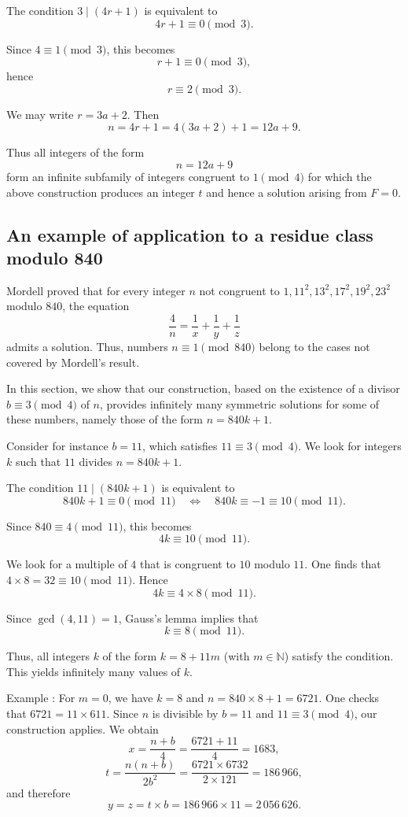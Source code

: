 \documentclass[12pt]{article}
\begin{document}
The condition $3 \mid (4r+1)$ is equivalent to
\[
4r+1 \equiv 0 \pmod{3}.
\]

Since $4 \equiv 1 \pmod{3}$, this becomes
\[
r+1 \equiv 0 \pmod{3},
\]
hence
\[
r \equiv 2 \pmod{3}.
\]

We may write $r = 3a+2$. Then
\[
n = 4r+1 = 4(3a+2)+1 = 12a+9.
\]

Thus all integers of the form
\[
n = 12a+9
\]
form an infinite subfamily of integers congruent to $1 \pmod{4}$
for which the above construction produces an integer $t$ and hence a solution arising from $F=0$.

\subsection*{An example of application to a residue class modulo 840}

Mordell proved that for every integer $n$ not congruent to $1, 11^2, 13^2, 17^2, 19^2, 23^2$ modulo $840$, the equation
\[
\frac{4}{n} = \frac{1}{x} + \frac{1}{y} + \frac{1}{z}
\]
admits a solution. Thus, numbers $n \equiv 1 \pmod{840}$ belong to the cases not covered by Mordell's result.

In this section, we show that our construction, based on the existence of a divisor $b \equiv 3 \pmod{4}$ of $n$, provides infinitely many symmetric solutions for some of these numbers, namely those of the form $n = 840k + 1$.

Consider for instance $b = 11$, which satisfies $11 \equiv 3 \pmod{4}$. We look for integers $k$ such that $11$ divides $n = 840k + 1$.

The condition $11 \mid (840k + 1)$ is equivalent to
\[
840k + 1 \equiv 0 \pmod{11} \quad \Longleftrightarrow \quad 840k \equiv -1 \equiv 10 \pmod{11}.
\]

Since $840 \equiv 4 \pmod{11}$, this becomes
\[
4k \equiv 10 \pmod{11}.
\]

We look for a multiple of $4$ that is congruent to $10$ modulo $11$. One finds that $4 \times 8 = 32 \equiv 10 \pmod{11}$. Hence
\[
4k \equiv 4 \times 8 \pmod{11}.
\]

Since $\gcd(4,11)=1$, Gauss's lemma implies that
\[
k \equiv 8 \pmod{11}.
\]

Thus, all integers $k$ of the form $k = 8 + 11m$ (with $m \in \mathbb{N}$) satisfy the condition. This yields infinitely many values of $k$.


Example : For $m = 0$, we have $k = 8$ and $n = 840 \times 8 + 1 = 6721$. One checks that $6721 = 11 \times 611$. Since $n$ is divisible by $b = 11$ and $11 \equiv 3 \pmod{4}$, our construction  applies. We obtain
\[
x = \frac{n + b}{4} = \frac{6721 + 11}{4} = 1683,
\]
\[
t = \frac{n(n + b)}{2b^2} = \frac{6721 \times 6732}{2 \times 121} = 186\,966,
\]
and therefore
\[
y = z = t \times b = 186\,966 \times 11 = 2\,056\,626.
\]
\end{document}
